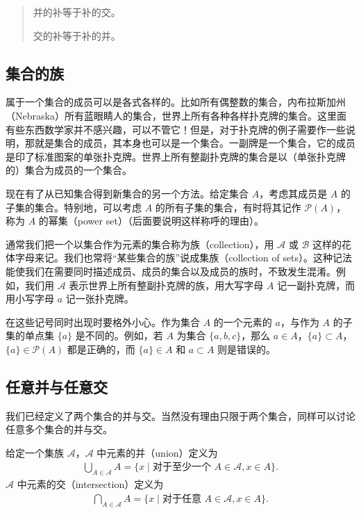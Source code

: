 \documentclass[../../main.tex]{subfiles}
\begin{document}
\begin{quote}
并的补等于补的交。

交的补等于补的并。
\end{quote}

\subsection*{集合的族}

属于一个集合的成员可以是各式各样的。比如所有偶整数的集合，内布拉斯加州（Nebraska）所有蓝眼睛人的集合，世界上所有各种各样扑克牌的集合。这里面有些东西数学家并不感兴趣，可以不管它！但是，对于扑克牌的例子需要作一些说明，那就是集合的成员，其本身也可以是一个集合。一副牌是一个集合，它的成员是印了标准图案的单张扑克牌。世界上所有整副扑克牌的集合是以（单张扑克牌的）集合为成员的一个集合。

现在有了从已知集合得到新集合的另一个方法。给定集合 $A$，考虑其成员是 $A$ 的子集的集合。特别地，可以考虑 $A$ 的所有子集的集合，有时将其记作 $\mathcal{P}(A)$，称为 $A$ 的幂集（power set）（后面要说明这样称呼的理由）。

通常我们把一个以集合作为元素的集合称为族（collection），用 $\mathcal{A}$ 或 $\mathcal{B}$ 这样的花体字母来记。我们也常将“某些集合的族”说成集族（collection of sets）。这种记法能使我们在需要同时描述成员、成员的集合以及成员的族时，不致发生混淆。例如，我们用 $\mathcal{A}$ 表示世界上所有整副扑克牌的族，用大写字母 $A$ 记一副扑克牌，而用小写字母 $a$ 记一张扑克牌。

在这些记号同时出现时要格外小心。作为集合 $A$ 的一个元素的 $a$，与作为 $A$ 的子集的单点集 $\{a\}$ 是不同的。例如，若 $A$ 为集合 $\{a, b, c\}$，那么 $a \in A$，$\{a\} \subset A$，$\{a\} \in \mathcal{P}(A)$ 都是正确的，而 $\{a\} \in A$ 和 $a \subset A$ 则是错误的。

\subsection*{任意并与任意交}

我们已经定义了两个集合的并与交。当然没有理由只限于两个集合，同样可以讨论任意多个集合的并与交。

给定一个集族 $\mathcal{A}$，$\mathcal{A}$ 中元素的并（union）定义为
\begin{align}
\bigcup_{A \in \mathcal{A}} A = \{x \mid \text{对于至少一个 } A \in \mathcal{A}, x \in A\}.\label{align:ch01-任意并}
\end{align}
$\mathcal{A}$ 中元素的交（intersection）定义为
\begin{align}
\bigcap_{A \in \mathcal{A}} A = \{x \mid \text{对于任意 } A \in \mathcal{A}, x \in A\}.\label{align:ch01-任意交}
\end{align}
\end{document}
